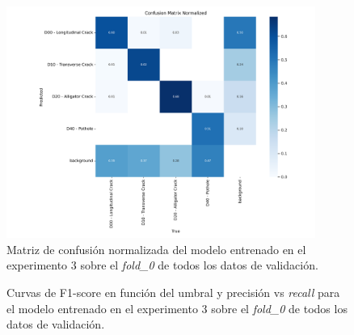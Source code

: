 \begin{figure}[H]
    \centering
    \includegraphics[width=0.9\textwidth]{img/exp3-val0-all-confusion_matrix_normalized.png}
    \caption{Matriz de confusión normalizada del modelo entrenado en el experimento 3 sobre el \textit{fold\_0} de todos los datos de validación.}
    \label{fig:exp3-val0-all-confusion_matrix_normalized}
\end{figure}

\begin{figure}[H]
    \centering
    \caption{Curvas de F1-score en función del umbral y precisión vs \textit{recall} para el modelo entrenado en el experimento 3 sobre el \textit{fold\_0} de todos los datos de validación.}
    \label{fig:exp3-val-all-curves}
\end{figure}